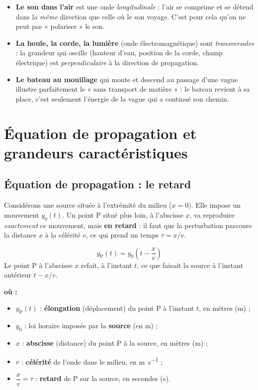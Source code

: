 \documentclass[11pt,a4paper]{article}
\newenvironment{ou}{%
  \par\smallskip\noindent\textbf{où :}\nopagebreak
  \begin{itemize}[leftmargin=1.8em,topsep=2pt,itemsep=1.5pt,parsep=0pt]}%
  {\end{itemize}}
\begin{document}
\begin{exemple}
\begin{itemize}[leftmargin=1.5em,topsep=2pt,itemsep=3pt]
  \item \textbf{Le son dans l'air} est une onde \emph{longitudinale} : l'air se comprime et
        se détend dans la \emph{même} direction que celle où le son voyage. C'est pour cela
        qu'on ne peut pas « polariser » le son.
  \item \textbf{La houle, la corde, la lumière} (onde électromagnétique) sont
        \emph{transversales} : la grandeur qui oscille (hauteur d'eau, position de la corde,
        champ électrique) est \emph{perpendiculaire} à la direction de propagation.
  \item \textbf{Le bateau au mouillage} qui monte et descend au passage d'une vague illustre
        parfaitement le « sans transport de matière » : le bateau revient à sa place, c'est
        seulement l'énergie de la vague qui a continué son chemin.
\end{itemize}
\end{exemple}

\section{Équation de propagation et grandeurs caractéristiques}

\subsection{Équation de propagation : le retard}

Considérons une source située à l'extrémité du milieu ($x=0$). Elle impose un mouvement
$y_0(t)$. Un point P situé plus loin, à l'abscisse $x$, va reproduire \emph{exactement} ce
mouvement, mais \textbf{en retard} : il faut que la perturbation parcoure la distance $x$ à la
célérité $v$, ce qui prend un temps $\tau = x/v$.

\begin{formule}
\[ \boxed{\,y_{\mathrm P}(t) = y_0\!\left(t - \dfrac{x}{v}\right)\,} \]
Le point P à l'abscisse $x$ refait, à l'instant $t$, ce que faisait la source à l'instant
antérieur $t - x/v$.
\begin{ou}
  \item $y_{\mathrm P}(t)$ : \textbf{élongation} (déplacement) du point P à l'instant $t$, en
        mètres (\si{\metre}) ;
  \item $y_0$ : loi horaire imposée par la \textbf{source} (en \si{\metre}) ;
  \item $x$ : \textbf{abscisse} (distance) du point P à la source, en mètres (\si{\metre}) ;
  \item $v$ : \textbf{célérité} de l'onde dans le milieu, en \si{\metre\per\second} ;
  \item $\dfrac{x}{v} = \tau$ : \textbf{retard} de P sur la source, en secondes (\si{\second}).
\end{ou}
\end{formule}
\end{document}
